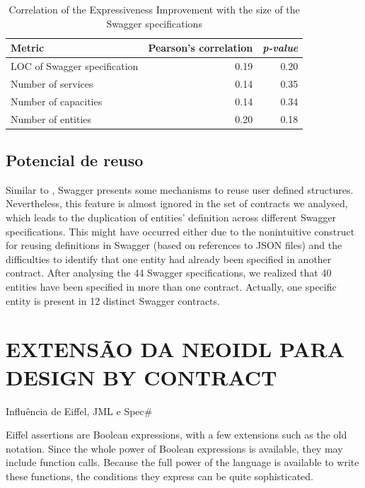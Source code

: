 \begin{table}[htb]
\caption{Correlation of the Expressiveness Improvement with the size of the Swagger specifications}
\begin{center}
\begin{tabular}{lrr} 
\toprule
Metric & Pearson's correlation & \emph{p-value} \\ \hline \hline 
LOC of Swagger specification & 0.19 &  0.20 \\ 
Number of services & 0.14 & 0.35 \\ 
Number of capacities & 0.14 & 0.34 \\
Number of entities & 0.20 & 0.18 \\ \bottomrule 
\end{tabular} 
\end{center}
\label{tab:size-corr}
\end{table}





\subsection{Potencial de reuso}



Similar to \neoidl{}, Swagger presents 
some mechanisms to reuse user defined structures. Nevertheless, 
this feature is almost ignored in the set of contracts we analysed, which 
leads to the duplication of entities' definition across different 
Swagger specifications. This might have occurred either due to the 
nonintuitive construct for reusing definitions in Swagger (based on 
references to JSON files) and the difficulties to identify 
that one entity had already been specified in another contract.
After analysing the 44 Swagger specifications, we realized that 40 entities 
have been specified in  more than one contract. Actually, one specific 
entity is present in 12 distinct Swagger contracts. 




 
\section{EXTENSÃO DA NEOIDL PARA DESIGN BY CONTRACT}

Influência de Eiffel, JML e Spec\#

Eiffel assertions are Boolean expressions, with a few extensions such as the old
notation. Since the whole power of Boolean expressions is available, they may
include function calls. Because the full power of the language is available to
write these functions, the conditions they express can be quite sophisticated.
\cite{meyer1992applying}

